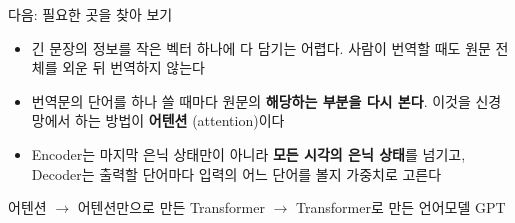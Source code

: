 \documentclass[aspectratio=169,11pt]{beamer}
\begin{document}
\begin{frame}{다음: 필요한 곳을 찾아 보기}
\begin{itemize}
\item 긴 문장의 정보를 작은 벡터 하나에 다 담기는 어렵다.
사람이 번역할 때도 원문 전체를 외운 뒤 번역하지 않는다
\item 번역문의 단어를 하나 쓸 때마다 원문의 \textbf{해당하는 부분을 다시 본다}.
이것을 신경망에서 하는 방법이 \textbf{어텐션} (attention)이다
\item Encoder는 마지막 은닉 상태만이 아니라 \textbf{모든 시각의 은닉 상태}를 넘기고,
Decoder는 출력할 단어마다 입력의 어느 단어를 볼지 가중치로 고른다
\end{itemize}
\vskip3mm
\begin{keybox}[9--11절]
어텐션 $\to$ 어텐션만으로 만든 Transformer $\to$ Transformer로 만든 언어모델 GPT
\end{keybox}
\end{frame}
\end{document}
